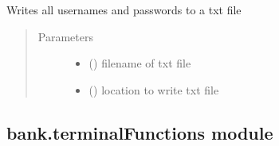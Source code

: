 \documentclass[letterpaper,10pt,english]{sphinxmanual}
\begin{document}
\begin{fulllineitems}
\begin{fulllineitems}
\begin{quote}
\begin{description}
\begin{itemize}
\end{itemize}

\end{description}\end{quote}

\end{fulllineitems}


\begin{fulllineitems}
\label{\detokenize{bank:bank.passwordAuthentication.Password.writeEncrypted}}
Writes all usernames and passwords to a txt file
\begin{quote}\begin{description}
\item[{Parameters}] \leavevmode\begin{itemize}
\item {} 
 () \textendash{} filename of txt file

\item {} 
 () \textendash{} location to write txt file

\end{itemize}

\end{description}\end{quote}

\end{fulllineitems}


\end{fulllineitems}



\subsection{bank.terminalFunctions module}
\label{\detokenize{bank:bank-terminalfunctions-module}}\label{\detokenize{bank:module-bank.terminalFunctions}}
\end{document}
